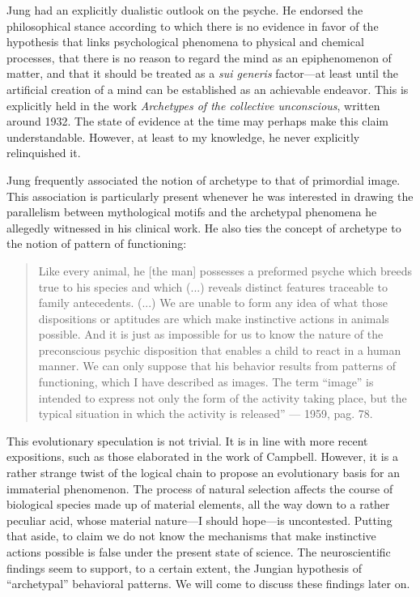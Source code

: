 \documentclass[a4paper]{article}
\begin{document}
Jung had an explicitly dualistic outlook on the psyche. He endorsed
the philosophical stance according to which there is no evidence in favor of
the hypothesis that links psychological phenomena to physical and chemical
processes, that there is no reason to regard the mind as an epiphenomenon of
matter, and that it should be treated as a \textit{sui generis} factor—at least
until the artificial creation of a mind can be established as an achievable
endeavor. This is explicitly held in the work \textit{Archetypes of the collective
unconscious}, written around 1932. The state of evidence at the time may
perhaps make this claim understandable. However, at least to my
knowledge, he never explicitly relinquished it. 

Jung frequently associated the notion of archetype to that of primordial image.
This association is particularly present whenever he was interested in drawing
the parallelism between mythological motifs and the archetypal phenomena he
allegedly witnessed in his clinical work. He also ties the concept of archetype
to the notion of pattern of functioning: 

\begin{quote}
Like every animal, he [the man] possesses
a preformed psyche which breeds true to his species and which (...) reveals
distinct features traceable to family antecedents. (...) We are unable to
form any idea of what those dispositions or aptitudes are which make
instinctive actions in animals possible. And it is just as impossible for us
to know the nature of the preconscious psychic disposition that enables a
child to react in a human manner. We can only suppose that his behavior
results from patterns of functioning, which I have described as images. The
term “image” is intended to express not only the form of the activity taking
place, but the typical situation in which the activity is released” — 1959,
pag. 78. 
\end{quote}

This evolutionary speculation is not trivial. It is in line with
more recent expositions, such as those elaborated in the work of Campbell.
However, it is a rather strange twist of the logical chain to propose an
evolutionary basis for an immaterial phenomenon. The process of natural
selection affects the course of biological species made up of material
elements, all the way down to a rather peculiar acid, whose material nature—I
should hope—is uncontested. Putting that aside, to claim we do not know the
mechanisms that make instinctive actions possible is false under the present
state of science. The neuroscientific findings seem to support, to a
certain extent, the Jungian hypothesis of “archetypal” behavioral patterns.
We will come to discuss these findings later on. 
\end{document}
